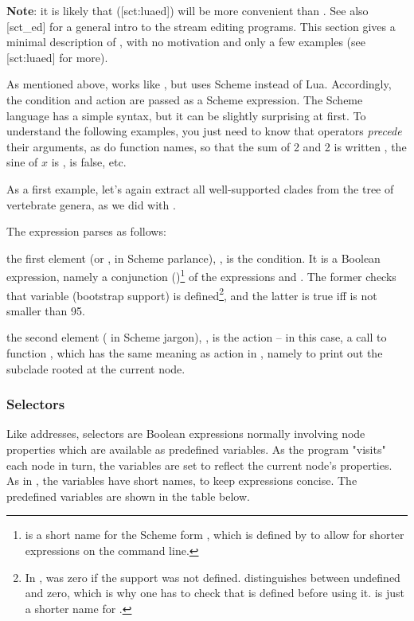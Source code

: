 {\bf Note}: it is likely that \luaed{} (\in{}[sct:luaed]) will be more
convenient than \sched. See also [sct_ed] for a general intro to the
stream editing programs. This section gives a minimal description of \sched,
with no motivation and only a few examples (see \in{}[sct:luaed] for more).

As mentioned above, \sched{} works like \luaed{}, but uses Scheme
instead of Lua. Accordingly, the condition and action are passed as a Scheme
expression. The Scheme language has a simple syntax, but it can
be slightly surprising at first. To understand the following examples, you just
need to know that operators {\em precede} their arguments, as do function
names, so that the sum of 2 and 2 is written , the sine of $x$
is ,  is false, etc.

As a first example, let's again extract all well-supported clades from the tree
of vertebrate genera, as we did with \luaed.


The expression  parses as follows:
\startitemize
	\item the first element (or , in Scheme parlance), , is the condition.  It is a Boolean expression, namely a
	conjunction (\code{\&})\footnote{\code{\&} is a short name for the Scheme form
	, which is defined by \sched{} to allow for shorter expressions on
	the command line.} of the expressions  and .
	The former checks that variable  (bootstrap support) is
	defined\footnote{In \ed,  was zero if the support was not defined.
	\sched{} distinguishes between undefined and zero, which is why one has to
	check that  is defined before using it.   is just a shorter
	name for .}, and the latter is true iff  is not smaller
	than 95.
	\item the second element ( in Scheme jargon), , is the
	action -- in this case, a call to function , which has the same
	meaning as action  in \ed, namely to print out the subclade rooted at
	the current node.
\stopitemize

\subsubsection{Selectors}

Like \ed{} addresses, \sched{} selectors are Boolean expressions normally
involving node properties which are available as predefined variables. As the
program "visits" each node in turn, the variables are set to reflect the current
node's properties. As in \ed{}, the variables have short names, to keep
expressions concise. The predefined variables are shown in the table below.

